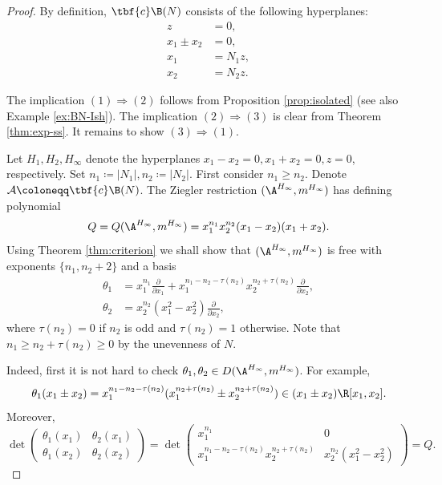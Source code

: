 \begin{proof}
By definition, $\tbf{c}\B(N)$ consists of the following hyperplanes: 
\begin{align*}
z &= 0 ,\\
x_{1}\pm x_{2}&= 0,\\
x_{1} &= N_1z , \\
x_{2} &= N_2z . 
\end{align*}

The implication $(1) \Rightarrow (2)$ follows from Proposition \ref{prop:isolated} (see also Example \ref{ex:BN-Ish}). 
The implication $(2) \Rightarrow (3)$ is clear from Theorem \ref{thm:exp-ss}. 
It remains to show $(3) \Rightarrow (1)$.
 
Let  $H_1,H_2,H_{\infty}$ denote the hyperplanes $x_1-x_2=0, x_1+x_2=0, z=0$, respectively. 
Set $n_1  \coloneqq |N_1|, n_2  \coloneqq  |N_2|$. 
First consider $n _1 \ge n_2$. 
Denote $ \mathcal{A}  \coloneqq \tbf{c}\B(N)$. 
The Ziegler restriction $(\A^{H_{\infty}}, m^{H_{\infty}})$ has defining polynomial 
$$Q = Q(\A^{H_{\infty}}, m^{H_{\infty}}) =x_{1}^{n_1}x_{2}^{n_2} (x_1-x_2)(x_1+x_2).$$
Using Theorem \ref{thm:criterion} we shall show that $(\A^{H_{\infty}}, m^{H_{\infty}})$ is free with  exponents $\{n_1,n_2+2\}$ and a basis
 \begin{align*}
\theta_1  & =x_{1}^{n_1} \frac{\partial}{\partial x_1} + x_{1}^{n_1-n_2-\tau(n_2)}  x_{2}^{n_2+\tau(n_2)}  \frac{\partial}{\partial x_2},\\
\theta_2  & = x_{2}^{n_2}  (x_1^2-x_2^2) \frac{\partial}{\partial x_2},
\end{align*}
where $\tau(n_2) = 0$ if $n_2$ is odd and $\tau(n_2) = 1$ otherwise. 
Note that $n_1\ge n_2+\tau(n_2) \ge 0$ by the unevenness of $N$.

Indeed, first it is not hard to check  $\theta_1, \theta_2 \in D(\A^{H_{\infty}}, m^{H_{\infty}})$. For example, 
$$\theta_1(x_{1}\pm x_{2}) =  x_{1}^{n_1-n_2-\tau(n_2)}(x_{1}^{n_2+\tau(n_2)} \pm  x_{2}^{n_2+\tau(n_2)}) \in (x_{1}\pm x_{2})\R[x_1,x_2]. $$
Moreover, 
$$
\det\begin{pmatrix}
\theta_1(x_{1}) & \theta_2(x_{1})\\
\theta_1(x_2) &\theta_2(x_2)
          \end{pmatrix}
          =
         \det \begin{pmatrix} x_{1}^{n_1} & 0\\
x_{1}^{n_1-n_2-\tau(n_2)}  x_{2}^{n_2+\tau(n_2)} &x_{2}^{n_2}  (x_1^2-x_2^2)
          \end{pmatrix}
     =Q.
       $$
       

\end{proof}

